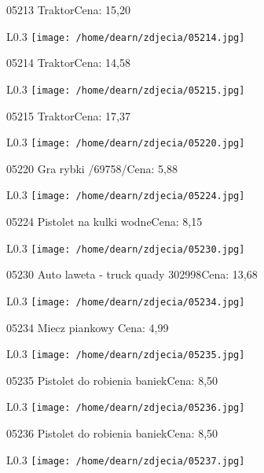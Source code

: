 05213 TraktorCena: 15,20\newline
\begin{wrapfigure}{L}{0.3\textwidth}
\texttt{[image: /home/dearn/zdjecia/05214.jpg]}
\end{wrapfigure}
05214 TraktorCena: 14,58\newline
\begin{wrapfigure}{L}{0.3\textwidth}
\texttt{[image: /home/dearn/zdjecia/05215.jpg]}
\end{wrapfigure}
05215 TraktorCena: 17,37\newline
\begin{wrapfigure}{L}{0.3\textwidth}
\texttt{[image: /home/dearn/zdjecia/05220.jpg]}
\end{wrapfigure}
05220 Gra rybki /69758/Cena: 5,88\newline
\begin{wrapfigure}{L}{0.3\textwidth}
\texttt{[image: /home/dearn/zdjecia/05224.jpg]}
\end{wrapfigure}
05224 Pistolet na kulki wodneCena: 8,15\newline
\begin{wrapfigure}{L}{0.3\textwidth}
\texttt{[image: /home/dearn/zdjecia/05230.jpg]}
\end{wrapfigure}
05230 Auto laweta - truck quady 302998Cena: 13,68\newline
\begin{wrapfigure}{L}{0.3\textwidth}
\texttt{[image: /home/dearn/zdjecia/05234.jpg]}
\end{wrapfigure}
05234 Miecz piankowy Cena: 4,99\newline
\begin{wrapfigure}{L}{0.3\textwidth}
\texttt{[image: /home/dearn/zdjecia/05235.jpg]}
\end{wrapfigure}
05235 Pistolet do robienia baniekCena: 8,50\newline
\begin{wrapfigure}{L}{0.3\textwidth}
\texttt{[image: /home/dearn/zdjecia/05236.jpg]}
\end{wrapfigure}
05236 Pistolet do robienia baniekCena: 8,50\newline
\begin{wrapfigure}{L}{0.3\textwidth}
\texttt{[image: /home/dearn/zdjecia/05237.jpg]}
\end{wrapfigure}
